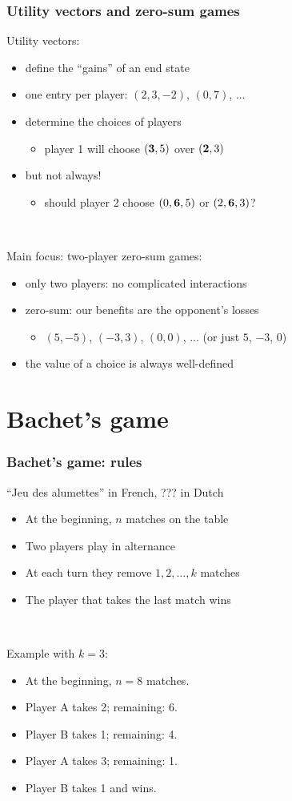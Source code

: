 \documentclass[12pt]{beamer}
\begin{document}
\begin{frame}
\frametitle{Utility vectors and zero-sum games}
Utility vectors:
\begin{itemize}
\item define the ``gains'' of an end state
\item one entry per player: $(2,3,-2)$, $(0,7)$, ...
\item determine the choices of players
\begin{itemize} \item player 1 will choose $({\bf 3},5)$ over $({\bf 2},3)$ \end{itemize}
\item but not always!
\begin{itemize} \item should player 2 choose $(0,{\bf 6},5)$ or $(2,{\bf 6},3)$? \end{itemize}
\end{itemize}

~

Main focus: two-player zero-sum games:
\begin{itemize}
\item only two players: no complicated interactions
\item zero-sum: our benefits are the opponent's losses
\begin{itemize} \item $(5,-5)$, $(-3,3)$, $(0,0)$, ... (or just $5$, $-3$, $0$) \end{itemize}
\item the value of a choice is always well-defined
\end{itemize}
\end{frame}


\section{Bachet's game}
\begin{frame}
\frametitle{Bachet's game: rules}
``Jeu des alumettes'' in French, ??? in Dutch
\begin{itemize}
\item At the beginning, $n$ matches on the table
\item Two players play in alternance
\item At each turn they remove $1,2,\ldots,k$ matches
\item The player that takes the last match wins
\end{itemize}

~

Example with $k=3$:
\begin{itemize}
\item At the beginning, $n = 8$ matches.
\item Player A takes 2; remaining: 6.
\item Player B takes 1; remaining: 4.
\item Player A takes 3; remaining: 1.
\item Player B takes 1 and wins.
\end{itemize}
\end{frame}
\end{document}
